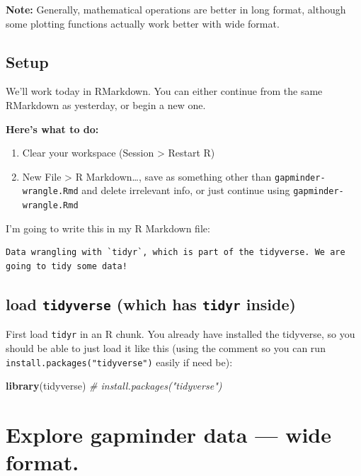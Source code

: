 \documentclass[]{book}
\newenvironment{Shaded}{\begin{snugshade}}{\end{snugshade}}
\newcommand{\KeywordTok}[1]{\textcolor[rgb]{0.13,0.29,0.53}{\textbf{{#1}}}}
\newcommand{\CommentTok}[1]{\textcolor[rgb]{0.56,0.35,0.01}{\textit{{#1}}}}
\newcommand{\NormalTok}[1]{{#1}}
\providecommand{\tightlist}{%
  \setlength{\itemsep}{0pt}\setlength{\parskip}{0pt}}
\theoremstyle{definition}
\theoremstyle{definition}
\theoremstyle{definition}
\theoremstyle{remark}
\begin{document}
\textbf{Note:} Generally, mathematical operations are better in long
format, although some plotting functions actually work better with wide
format.

\subsection{Setup}\label{setup-1}

We'll work today in RMarkdown. You can either continue from the same
RMarkdown as yesterday, or begin a new one.

\textbf{Here's what to do:}

\begin{enumerate}
\def\labelenumi{\arabic{enumi}.}
\tightlist
\item
  Clear your workspace (Session \textgreater{} Restart R)
\item
  New File \textgreater{} R Markdown\ldots{}, save as something other
  than \texttt{gapminder-wrangle.Rmd} and delete irrelevant info, or
  just continue using \texttt{gapminder-wrangle.Rmd}
\end{enumerate}

I'm going to write this in my R Markdown file:

\begin{verbatim}
Data wrangling with `tidyr`, which is part of the tidyverse. We are going to tidy some data!
\end{verbatim}

\subsection{\texorpdfstring{load \texttt{tidyverse} (which has
\texttt{tidyr}
inside)}{load tidyverse (which has tidyr inside)}}\label{load-tidyverse-which-has-tidyr-inside}

First load \texttt{tidyr} in an R chunk. You already have installed the
tidyverse, so you should be able to just load it like this (using the
comment so you can run \texttt{install.packages("tidyverse")} easily if
need be):

\begin{Shaded}
\begin{Highlighting}[]
\KeywordTok{library}\NormalTok{(tidyverse) }\CommentTok{# install.packages("tidyverse")}
\end{Highlighting}
\end{Shaded}

\section{Explore gapminder data --- wide
format.}\label{explore-gapminder-data-wide-format.}
\end{document}
